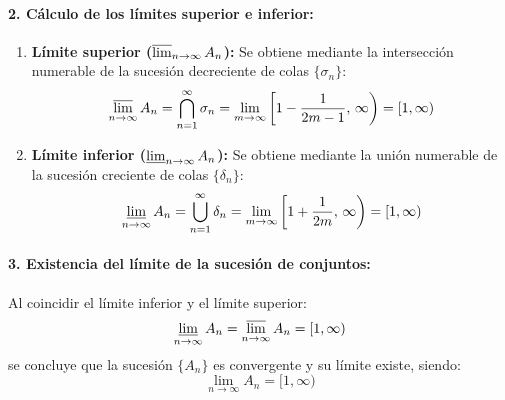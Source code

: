 \begin{problema}
\paragraph{2. Cálculo de los límites superior e inferior:}
\begin{enumerate}[label=\arabic*.]
    \item \textbf{Límite superior ($\varlimsup_{n \to \infty} A_n$):}
    Se obtiene mediante la intersección numerable de la sucesión decreciente de colas $\{\sigma_n\}$:
    \[
        \varlimsup_{n \to \infty} A_n = \bigcap_{n=1}^\infty \sigma_n = \lim_{m \to \infty} \left[ 1 - \frac{1}{2m-1}, \, \infty \right) = [1, \infty)
    \]

    \item \textbf{Límite inferior ($\varliminf_{n \to \infty} A_n$):}
    Se obtiene mediante la unión numerable de la sucesión creciente de colas $\{\delta_n\}$:
    \[
        \varliminf_{n \to \infty} A_n = \bigcup_{n=1}^\infty \delta_n = \lim_{m \to \infty} \left[ 1 + \frac{1}{2m}, \, \infty \right) = [1, \infty)
    \]
\end{enumerate}

\paragraph{3. Existencia del límite de la sucesión de conjuntos:}
Al coincidir el límite inferior y el límite superior:
\[
    \varliminf_{n \to \infty} A_n = \varlimsup_{n \to \infty} A_n = [1, \infty)
\]
se concluye que la sucesión $\{A_n\}$ es convergente y su límite existe, siendo:
\[
    \lim_{n \to \infty} A_n = [1, \infty)
\]
\end{problema}
\newpage

